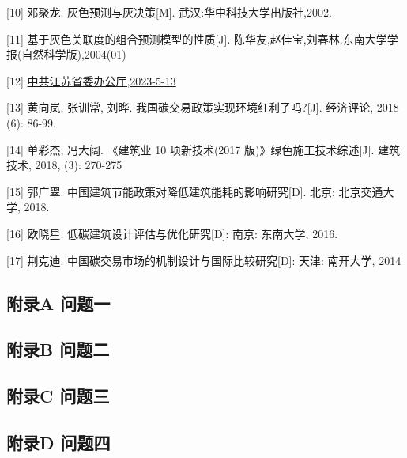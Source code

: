 \documentclass[a4paper, 12pt]{article}
\numberwithin{equation}{section}
\begin{document}
    [10] 邓聚龙. 灰色预测与灰决策[M]. 武汉:华中科技大学出版社,2002.

    [11] 基于灰色关联度的组合预测模型的性质[J]. 陈华友,赵佳宝,刘春林.东南大学学报(自然科学版),2004(01)

    [12] \href{http://www.zgjssw.gov.cn/fabuting/shengweiwenjian/202202/t20220208_7412170.shtml}{中共江苏省委办公厅,2023-5-13}

    [13] 黄向岚, 张训常, 刘晔. 我国碳交易政策实现环境红利了吗?[J]. 经济评论, 2018 (6): 86-99.

    [14] 单彩杰, 冯大阔. 《建筑业 10 项新技术(2017 版)》绿色施工技术综述[J]. 建筑技术, 2018, (3): 270-275

    [15] 郭广翠. 中国建筑节能政策对降低建筑能耗的影响研究[D]. 北京: 北京交通大学, 2018.

    [16]  欧晓星. 低碳建筑设计评估与优化研究[D]: 南京: 东南大学, 2016.

    [17] 荆克迪. 中国碳交易市场的机制设计与国际比较研究[D]: 天津: 南开大学, 2014

    \newpage

    {}
        \subsection*{附录A \hspace{2em} 问题一}
            

        \subsection*{附录B \hspace{2em} 问题二}
            

        \subsection*{附录C \hspace{2em} 问题三}
            

        \subsection*{附录D \hspace{2em} 问题四}
            
\end{document}
